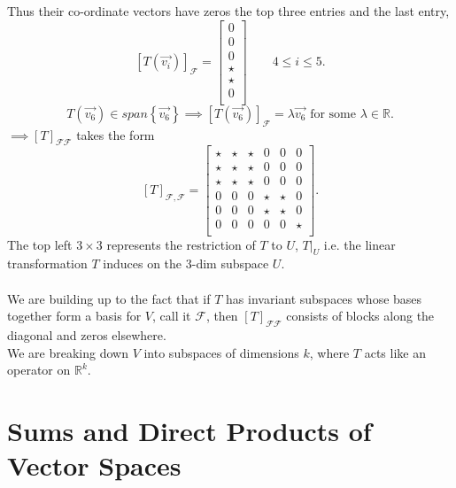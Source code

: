 \documentclass{report}
\begin{document}
Thus their co-ordinate vectors have zeros the top three entries and the last entry, 
\[
	\left[ T \left( \vec{ v_i}  \right)  \right] _{ \mathcal{F}} = \begin{bmatrix}
		0\\
		 0\\
		 0\\
	\star\\
	\star\\
	0\\
	\end{bmatrix}
	   \qquad  4 \leq i \leq 5
.\] 
\[
T \left(  \vec{ v_6}  \right) \in span \left\{ \vec{ v_6}  \right\} \implies \left[ T \left( \vec{ v_6}  \right)  \right] _{ \mathcal{F}} = \lambda \vec{ v_6} \text{ for some } \lambda \in \mathbb{R}
.\] 
$ \implies \left[ T \right] _{ \mathcal{F} \mathcal{F}}$ takes the form
\[
	\left[ T \right] _{ \mathcal{F} , \mathcal{F}} = \begin{bmatrix}
		\star & \star & \star & 0 & 0 & 0\\
		\star & \star & \star & 0 & 0 & 0\\
		\star & \star & \star & 0 & 0 & 0\\
		0 & 0 & 0 & \star & \star & 0\\
		0 & 0 & 0 & \star & \star & 0\\
		0 & 0 & 0 & 0 & 0 & \star\\
	\end{bmatrix}
.\]
 The top left $ 3 \times  3$ represents the restriction of $ T$ to $ U$, $ T \big|_{U}^{} $ i.e.  the linear transformation $ T$ induces on the $ 3$-dim subspace $ U$.\\
    \\
We are building up to the fact that if $ T$ has invariant subspaces whose bases together form a basis for $ V$, call it $  \mathcal{F}$, then $ \left[ T \right] _{ \mathcal{F} \mathcal{F}}$ consists of blocks along the diagonal and zeros elsewhere.\\
We are breaking down $ V$ into subspaces of dimensions $ k$, where $ T$ acts like an operator on $ \mathbb{R} ^{ k}$.\\
\section{Sums and Direct Products of Vector Spaces}
\end{document}
